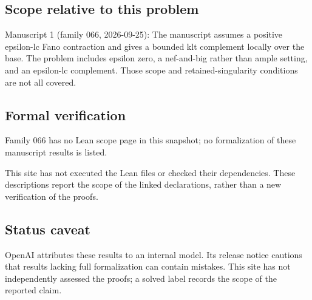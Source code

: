 \documentclass[11pt]{article}
\begin{document}
\subsection{Scope relative to this problem}
Manuscript 1 (family 066, 2026-09-25): The manuscript assumes a positive epsilon-lc Fano contraction and gives a bounded klt complement locally over the base. The problem includes epsilon zero, a nef-and-big rather than ample setting, and an epsilon-lc complement. Those scope and retained-singularity conditions are not all covered.

\subsection{Formal verification}
Family 066 has no Lean scope page in this snapshot; no formalization of these manuscript results is listed.

This site has not executed the Lean files or checked their dependencies. These descriptions report the scope of the linked declarations, rather than a new verification of the proofs.

\subsection{Status caveat}
OpenAI attributes these results to an internal model. Its release notice cautions that results lacking full formalization can contain mistakes. This site has not independently assessed the proofs; a solved label records the scope of the reported claim.
\end{document}
